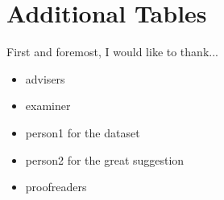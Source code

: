 \appendix

\chapter{Additional Tables}

First and foremost, I would like to thank...
\begin{itemize}
\item{advisers}
\item{examiner}
\item{person1 for the dataset}
\item{person2 for the great suggestion}
\item{proofreaders}
\end{itemize}